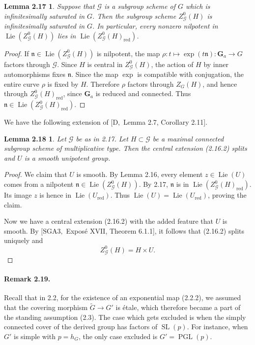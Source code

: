 \documentclass[11pt]{article}
\newcommand{\Ga}{\mathbf G_a}
\newcommand{\Lie}{\operatorname{Lie}}
\newcommand{\red}{\mathrm{red}}
\newtheorem*{lemma217}{Lemma 2.17}
\newtheorem*{lemma218}{Lemma 2.18}
\newcommand{\SL}{\operatorname{SL}}
\newcommand{\PGL}{\operatorname{PGL}}
\begin{document}
\begin{lemma217}
Suppose that \(\mathcal G\) is a subgroup scheme of \(G\) which is infinitesimally
saturated in \(G\). Then the subgroup scheme \(Z^0_{\mathcal G}(H)\) is infinitesimally
saturated in \(G\). In particular, every nonzero nilpotent in
\(\Lie(Z^0_{\mathcal G}(H))\) lies in \(\Lie(Z^0_{\mathcal G}(H)_{\red})\).
\end{lemma217}

\begin{proof}
If \(\mathfrak n\in\Lie(Z^0_{\mathcal G}(H))\) is nilpotent, the map
\(\rho:t\mapsto \exp(t\mathfrak n):\Ga\to G\) factors through \(\mathcal G\). Since
\(H\) is central in \(Z^0_{\mathcal G}(H)\), the action of \(H\) by inner automorphisms
fixes \(\mathfrak n\). Since the map \(\exp\) is compatible with conjugation, the entire
curve \(\rho\) is fixed by \(H\). Therefore \(\rho\) factors through \(Z_G(H)\), and
hence through \(Z^0_{\mathcal G}(H)_{\red}\), since \(\Ga\) is reduced and connected.
Thus \(\mathfrak n\in\Lie(Z^0_{\mathcal G}(H)_{\red})\).
\end{proof}

We have the following extension of \([\mathrm D,\) Lemma 2.7, Corollary 2.11].

\begin{lemma218}
Let \(\mathcal G\) be as in 2.17. Let \(H\subset\mathcal G\) be a maximal connected
subgroup scheme of multiplicative type. Then the central extension (2.16.2) splits and
\(U\) is a smooth unipotent group.
\end{lemma218}

\begin{proof}
We claim that \(U\) is smooth. By Lemma 2.16, every element \(z\in\Lie(U)\) comes from
a nilpotent \(\mathfrak n\in\Lie(Z^0_{\mathcal G}(H))\). By 2.17,
\(\mathfrak n\) is in \(\Lie(Z^0_{\mathcal G}(H)_{\red})\). Its image \(z\) is hence in
\(\Lie(U_{\red})\). Thus \(\Lie(U)=\Lie(U_{\red})\), proving the claim.

Now we have a central extension (2.16.2) with the added feature that \(U\) is smooth.
By \([\mathrm{SGA3},\) Exposé XVII, Theorem 6.1.1], it follows that (2.16.2) splits
uniquely and
\begin{equation}
  Z^0_{\mathcal G}(H)=H\times U.
  \tag{2.18.1}
\end{equation}
\end{proof}

\paragraph{Remark 2.19.}
Recall that in 2.2, for the existence of an exponential map (2.2.2), we assumed that
the covering morphism \(\widetilde G\to G'\) is étale, which therefore became a part of
the standing assumption (2.3). The case which gets excluded is when the simply connected
cover of the derived group has factors of \(\SL(p)\). For instance, when \(G'\) is simple
with \(p=h_G\), the only case excluded is \(G'=\PGL(p)\).
\end{document}
